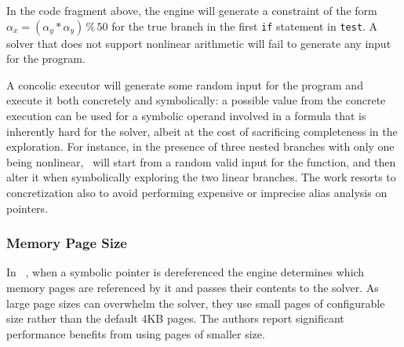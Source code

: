\noindent In the code fragment above, the engine will generate a constraint of the form $\alpha_x = (\alpha_y*\alpha_y)\,\%\,50$ for the true branch in the first {\tt if} statement in {\tt test}. A solver that does not support nonlinear arithmetic will fail to generate any input for the program.

A concolic executor will generate some random input for the program and execute it both concretely and symbolically: a possible value from the concrete execution can be used for a symbolic operand involved in a formula that is inherently hard for the solver, albeit at the cost of sacrificing completeness in the exploration. For instance, in the presence of three nested branches with only one being nonlinear,~\cite{DART-PLDI05} will start from a random valid input for the function, and then alter it when symbolically exploring the two linear branches. The work resorts to concretization also to avoid performing expensive or imprecise alias analysis on pointers. %

\subsubsection{Memory Page Size}
In \stwoe~\cite{CKC-TOCS12}, when a symbolic pointer is dereferenced the engine determines which memory pages are referenced by it and passes their contents to the solver. As large page sizes can overwhelm the solver, they use small pages of configurable size rather than the default 4KB pages. The authors report significant performance benefits from using pages of smaller size.